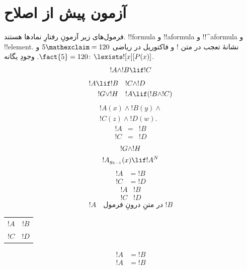 \documentclass[openany]{memoir}
\begin{document}
\section*{آزمون پیش از اصلاح}
\olgreekformulas
\noindent فرمول‌های زیر آزمونِ رفتارِ نمادها هستند.
!!{formula} و !!a{formula} و !!^a{formula} و !!{element}.
نشانهٔ تعجب در متن ! و فاکتوریل در ریاضی $5\mathexclaim=120$ و $\fact{5}=120$.
وجودِ یگانه: $\lexists![x][P(x)]$.
\[
!A \land !B \lif !C
\]
\begin{align*}
!A \lif !B & \quad !C \land !D \\
!G \lor !H & \quad !A \lif (!B \land !C)
\end{align*}
\begin{multline*}
!A(x) \land !B(y) \land {}\\
!C(z) \land !D(w).
\end{multline*}
\begin{eqnarray*}
!A&=&!B\\
!C&=&!D
\end{eqnarray*}
\begin{gather*}
!G\land !H\\
!A_{g_{k-1}}(x)\lif !A^N
\end{gather*}
\[\begin{aligned}!A&=!B\\!C&=!D\end{aligned}\]
\[\begin{array}{cc}!A&!B\\!C&!D\end{array}\]
\begin{equation}!A\quad\text{در متنِ درونِ فرمول $!B$}\tag{آزمون $!C$}\end{equation}
\begin{tabular}{cc}
$!A$ & $!B$\\
$!C$ & $!D$
\end{tabular}
\par
\ollatinformulas
\begin{align*}!A&=!B\end{align*}
\olalphagreekformulas
\begin{align*}!A&=!B\end{align*}
\olgreekformulas
\clearpage

\end{document}
